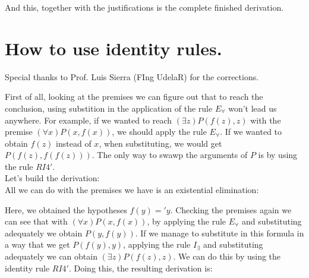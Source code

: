 \documentclass{article}
\begin{document}
And this, together with the justifications is the complete finished derivation.

\newpage

\section{How to use identity rules.}

Special thanks to Prof. Luis Sierra (FIng UdelaR) for the corrections. \\

\noindent{}
\newline \newline

First of all, looking at the premises we can figure out that to reach the conclusion, using substition in the application of the rule $E_{\forall}$ won't lead us anywhere. For example, if we wanted to reach $(\exists z)P(f(z), z)$ with the premise $(\forall x)P(x, f(x))$, we should apply the rule $E_{\forall}$. If we wanted to obtain $f(z)$ instead of $x$, when substituting, we would get $P(f(z), f(f(z)))$. The only way to swawp the arguments of $P$ is by using the rule $RI4'$. \\

Let's build the derivation: \\

All we can do with the premises we have is an existential elimination:

\begin{prooftree}
\end{prooftree}

Here, we obtained the hypotheses $f(y) =' y$. Checking the premises again we can see that with $(\forall x)P(x, f(x))$, by applying the rule $E_{\forall}$ and substituting adequately we obtain $P(y, f(y))$. If we manage to substitute in this formula in a way that we get $P(f(y), y)$, applying the rule $I_{\exists}$ and substituting adequately we can obtain $(\exists z)P(f(z), z)$. We can do this by using the identity rule $RI4'$.
Doing this, the resulting derivation is:
\end{document}
